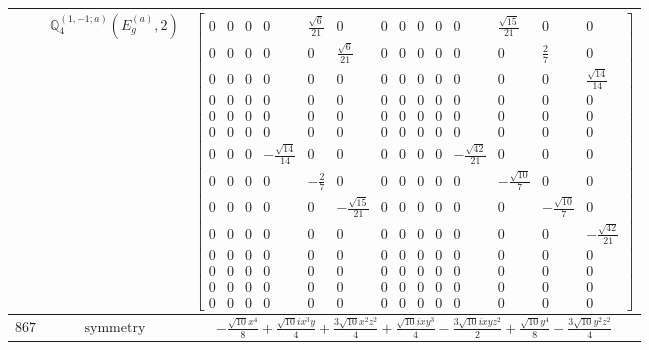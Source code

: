 \documentclass[fleqn,8pt,landscape]{jsarticle}
\begin{document}
\begin{longtable}{ccc}
$  $ & $ \mathbb{Q}_{4}^{(1,-1;a)}(E_{g}^{(a)},2) $ & $ \begin{bmatrix} 0 & 0 & 0 & 0 & \frac{\sqrt{6}}{21} & 0 & 0 & 0 & 0 & 0 & 0 & \frac{\sqrt{15}}{21} & 0 & 0 \\ 0 & 0 & 0 & 0 & 0 & \frac{\sqrt{6}}{21} & 0 & 0 & 0 & 0 & 0 & 0 & \frac{2}{7} & 0 \\ 0 & 0 & 0 & 0 & 0 & 0 & 0 & 0 & 0 & 0 & 0 & 0 & 0 & \frac{\sqrt{14}}{14} \\ 0 & 0 & 0 & 0 & 0 & 0 & 0 & 0 & 0 & 0 & 0 & 0 & 0 & 0 \\ 0 & 0 & 0 & 0 & 0 & 0 & 0 & 0 & 0 & 0 & 0 & 0 & 0 & 0 \\ 0 & 0 & 0 & 0 & 0 & 0 & 0 & 0 & 0 & 0 & 0 & 0 & 0 & 0 \\ 0 & 0 & 0 & - \frac{\sqrt{14}}{14} & 0 & 0 & 0 & 0 & 0 & 0 & - \frac{\sqrt{42}}{21} & 0 & 0 & 0 \\ 0 & 0 & 0 & 0 & - \frac{2}{7} & 0 & 0 & 0 & 0 & 0 & 0 & - \frac{\sqrt{10}}{7} & 0 & 0 \\ 0 & 0 & 0 & 0 & 0 & - \frac{\sqrt{15}}{21} & 0 & 0 & 0 & 0 & 0 & 0 & - \frac{\sqrt{10}}{7} & 0 \\ 0 & 0 & 0 & 0 & 0 & 0 & 0 & 0 & 0 & 0 & 0 & 0 & 0 & - \frac{\sqrt{42}}{21} \\ 0 & 0 & 0 & 0 & 0 & 0 & 0 & 0 & 0 & 0 & 0 & 0 & 0 & 0 \\ 0 & 0 & 0 & 0 & 0 & 0 & 0 & 0 & 0 & 0 & 0 & 0 & 0 & 0 \\ 0 & 0 & 0 & 0 & 0 & 0 & 0 & 0 & 0 & 0 & 0 & 0 & 0 & 0 \\ 0 & 0 & 0 & 0 & 0 & 0 & 0 & 0 & 0 & 0 & 0 & 0 & 0 & 0 \end{bmatrix} $ \\ \hline
$ 867 $ & $ \text{symmetry} $ & $ - \frac{\sqrt{10} x^{4}}{8} + \frac{\sqrt{10} i x^{3} y}{4} + \frac{3 \sqrt{10} x^{2} z^{2}}{4} + \frac{\sqrt{10} i x y^{3}}{4} - \frac{3 \sqrt{10} i x y z^{2}}{2} + \frac{\sqrt{10} y^{4}}{8} - \frac{3 \sqrt{10} y^{2} z^{2}}{4} $ \\

\end{longtable}
\end{document}
